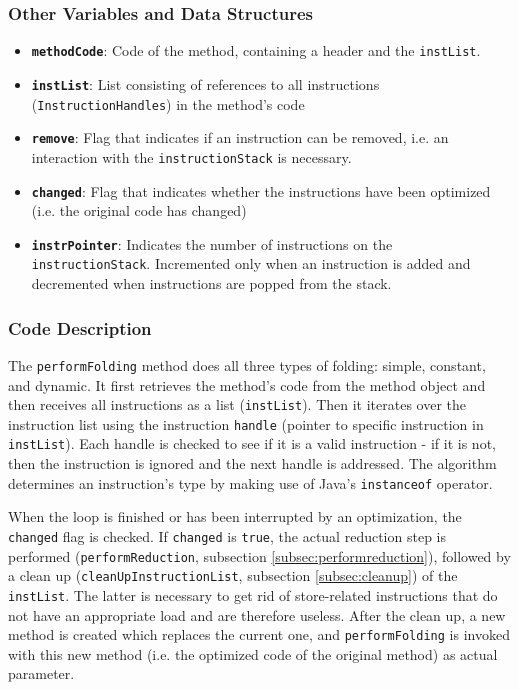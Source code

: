 \subsubsection{Other Variables and Data Structures}
\begin{itemize}
\item \textbf{\texttt{methodCode}}: Code of the method, containing a header and the \texttt{instList}.
\item \textbf{\texttt{instList}}: List consisting of references to all instructions (\texttt{InstructionHandles}) in the method's code
\item \textbf{\texttt{remove}}: Flag that indicates if an instruction can be removed, i.e. an interaction with the \texttt{instructionStack} is necessary.
\item \textbf{\texttt{changed}}: Flag that indicates whether the instructions have been optimized (i.e. the original code has changed) 
\item \textbf{\texttt{instrPointer}}: Indicates the number of instructions on the \texttt{instructionStack}. Incremented only when an instruction is added and decremented when instructions are popped from the stack.
\end{itemize}

\subsubsection{Code Description}
The \texttt{performFolding} method does all three types of folding: simple, constant, and dynamic. It first retrieves the method's code from the method object and then receives all instructions as a list (\texttt{instList}). Then it iterates over the instruction list using the instruction \texttt{handle} (pointer to specific instruction in \texttt{instList}). Each handle is checked to see if it is a valid instruction - if it is not, then the instruction is ignored and the next handle is addressed. The algorithm determines an instruction’s type by making use of Java's \texttt{instanceof} operator.

When the loop is finished or has been interrupted by an optimization, the \texttt{changed} flag is checked. If \texttt{changed} is \texttt{true}, the actual reduction step is performed (\texttt{performReduction}, subsection \ref{subsec:performreduction}), followed by a clean up (\texttt{cleanUpInstructionList}, subsection \ref{subsec:cleanup}) of the \texttt{instList}. The latter is necessary to get rid of store-related instructions that do not have an appropriate load and are therefore useless. After the clean up, a new method is created which replaces the current one, and \texttt{performFolding} is invoked with this new method (i.e. the optimized code of the original method) as actual parameter.

